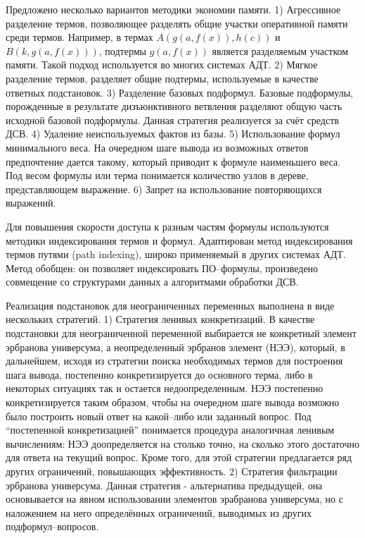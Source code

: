 \documentclass[a4paper]{report}
\begin{document}
Предложено несколько вариантов методики экономии памяти. 1) Агрессивное разделение термов, позволяющее разделять общие участки оперативной памяти среди термов. Например, в термах $A(g(a,f(x)),h(c))$ и $B(k,g(a,f(x)))$, подтермы $g(a,f(x))$ является разделяемым участком памяти. Такой подход используется во многих системах АДТ. 2) Мягкое разделение термов, разделяет общие подтермы, используемые в качестве ответных подстановок. 3) Разделение базовых подформул. Базовые подформулы, порожденные в результате дизъюнктивного ветвления разделяют общую часть исходной базовой подформулы. Данная стратегия реализуется за счёт средств ДСВ. 4) Удаление неиспользуемых фактов из базы. 5) Использование формул минимального веса. На очередном шаге вывода из возможных ответов предпочтение дается такому, который приводит к формуле наименьшего веса. Под весом формулы или терма понимается количество узлов в дереве, представляющем выражение. 6) Запрет на использование повторяющихся выражений.

Для повышения скорости доступа к разным частям формулы используются методики индексирования термов и формул. Адаптирован метод индексирования термов путями (path indexing), широко применяемый в других системах АДТ. Метод обобщен: он позволяет индексировать ПО--формулы, произведено совмещение со структурами данных а алгоритмами обработки ДСВ.

Реализация подстановок для неограниченных переменных выполнена в виде нескольких стратегий. 1) Стратегия ленивых конкретизаций. В качестве подстановки для неограниченной переменной выбирается не конкретный элемент эрбранова универсума, а неопределенный эрбранов элемент (НЭЭ), который, в дальнейшем, исходя из стратегии поиска необходимых термов для построения шага вывода, постепенно конкретизируется до основного терма, либо в некоторых ситуациях так и остается недоопределенным. НЭЭ постепенно конкретизируется таким образом, чтобы на очередном шаге вывода возможно было построить новый ответ на какой--либо или заданный вопрос. Под ``постепенной конкретизацией'' понимается процедура аналогичная ленивым вычислениям: НЭЭ доопределяется на столько точно, на сколько этого достаточно для ответа на текущий вопрос. Кроме того, для этой стратегии предлагается ряд других ограничений, повышающих эффективность.  2) Стратегия фильтрации эрбранова универсума. Данная стратегия - альтернатива предыдущей, она основывается на явном использовании элементов эрабранова универсума, но с наложением на него определённых ограничений, выводимых из других подформул--вопросов.
\end{document}
